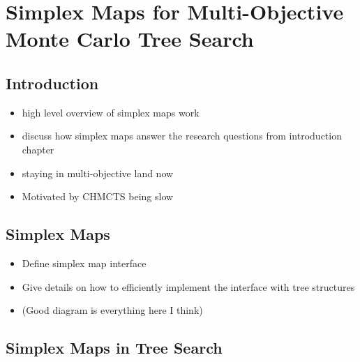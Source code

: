 

\chapter{\label{ch:6-simplexmaps}Simplex Maps for Multi-Objective Monte Carlo Tree Search} 

    \minitoc

\section{Introduction}
\label{sec:6-1-intro}

    \begin{itemize}
        \item high level overview of simplex maps work
        \item discuss how simplex maps answer the research questions from introduction chapter
        \item staying in multi-objective land now
        \item Motivated by CHMCTS being slow
    \end{itemize}  

\section{Simplex Maps}
\label{sec:6-2-simplexmaps}

    \begin{itemize}
        \item Define simplex map interface
        \item Give details on how to efficiently implement the interface with tree structures
        \item (Good diagram is everything here I think)
    \end{itemize}

\section{Simplex Maps in Tree Search}
\label{sec:6-3-mapsintrees}

